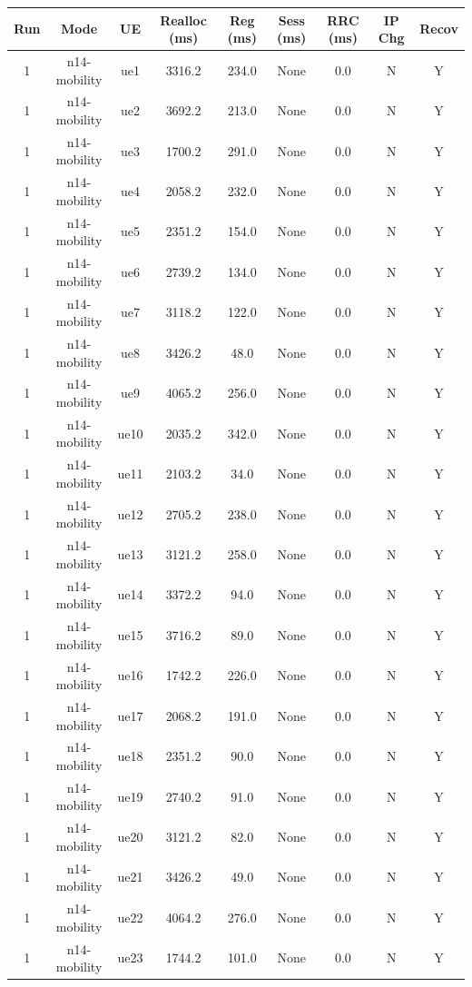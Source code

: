 \begin{table}[ht]
\centering
\begin{tabular}{|c|c|c|c|c|c|c|c|c|}
\hline
Run & Mode & UE & Realloc (ms) & Reg (ms) & Sess (ms) & RRC (ms) & IP Chg & Recov \\
\hline
1 & n14-mobility & ue1 & 3316.2 & 234.0 & None & 0.0 & N & Y \\
1 & n14-mobility & ue2 & 3692.2 & 213.0 & None & 0.0 & N & Y \\
1 & n14-mobility & ue3 & 1700.2 & 291.0 & None & 0.0 & N & Y \\
1 & n14-mobility & ue4 & 2058.2 & 232.0 & None & 0.0 & N & Y \\
1 & n14-mobility & ue5 & 2351.2 & 154.0 & None & 0.0 & N & Y \\
1 & n14-mobility & ue6 & 2739.2 & 134.0 & None & 0.0 & N & Y \\
1 & n14-mobility & ue7 & 3118.2 & 122.0 & None & 0.0 & N & Y \\
1 & n14-mobility & ue8 & 3426.2 & 48.0 & None & 0.0 & N & Y \\
1 & n14-mobility & ue9 & 4065.2 & 256.0 & None & 0.0 & N & Y \\
1 & n14-mobility & ue10 & 2035.2 & 342.0 & None & 0.0 & N & Y \\
1 & n14-mobility & ue11 & 2103.2 & 34.0 & None & 0.0 & N & Y \\
1 & n14-mobility & ue12 & 2705.2 & 238.0 & None & 0.0 & N & Y \\
1 & n14-mobility & ue13 & 3121.2 & 258.0 & None & 0.0 & N & Y \\
1 & n14-mobility & ue14 & 3372.2 & 94.0 & None & 0.0 & N & Y \\
1 & n14-mobility & ue15 & 3716.2 & 89.0 & None & 0.0 & N & Y \\
1 & n14-mobility & ue16 & 1742.2 & 226.0 & None & 0.0 & N & Y \\
1 & n14-mobility & ue17 & 2068.2 & 191.0 & None & 0.0 & N & Y \\
1 & n14-mobility & ue18 & 2351.2 & 90.0 & None & 0.0 & N & Y \\
1 & n14-mobility & ue19 & 2740.2 & 91.0 & None & 0.0 & N & Y \\
1 & n14-mobility & ue20 & 3121.2 & 82.0 & None & 0.0 & N & Y \\
1 & n14-mobility & ue21 & 3426.2 & 49.0 & None & 0.0 & N & Y \\
1 & n14-mobility & ue22 & 4064.2 & 276.0 & None & 0.0 & N & Y \\
1 & n14-mobility & ue23 & 1744.2 & 101.0 & None & 0.0 & N & Y \\

\end{tabular}
\end{table}
